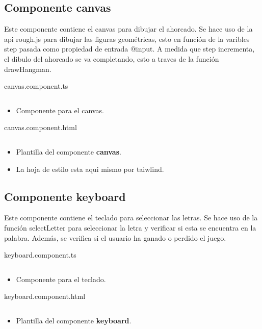 \documentclass{article}
\newenvironment{block}{\captionsetup{type=listing}}{}
\begin{document}
\subsection{Componente canvas}
Este componente contiene el canvas para dibujar el ahorcado. Se hace uso de la api rough.js para dibujar las figuras geométricas, esto en función de la varibles step pasada como propiedad de entrada @input. A medida que step incrementa, el dibulo del ahorcado se va completando, esto a traves de la función drawHangman.


\begin{block}
	\caption{canvas.component.ts}
	\inputminted{TypeScript}{../hangMan/src/app/canvas/canvas.component.ts}
	\begin{itemize}
		\item Componente para el canvas.
	\end{itemize}

	\caption{canvas.component.html}
	\inputminted{HTML}{../hangMan/src/app/canvas/canvas.component.html}
	\begin{itemize}
		\item Plantilla del componente \textbf{canvas}.
		\item La hoja de estilo esta aqui mismo por taiwlind.
	\end{itemize}
\end{block}
\pagebreak

\subsection{Componente keyboard}
Este componente contiene el teclado para seleccionar las letras. Se hace uso de la función selectLetter para seleccionar la letra y verificar si esta se encuentra en la palabra. Además, se verifica si el usuario ha ganado o perdido el juego.
\begin{block}
	\caption{keyboard.component.ts}
	\inputminted{TypeScript}{../hangMan/src/app/keyboard/keyboard.component.ts}
	\begin{itemize}
		\item Componente para el teclado.
	\end{itemize}

	\caption{keyboard.component.html}
	\inputminted{HTML}{../hangMan/src/app/keyboard/keyboard.component.html}
	\begin{itemize}
		\item Plantilla del componente \textbf{keyboard}.
	\end{itemize}

\end{block}
\end{document}
